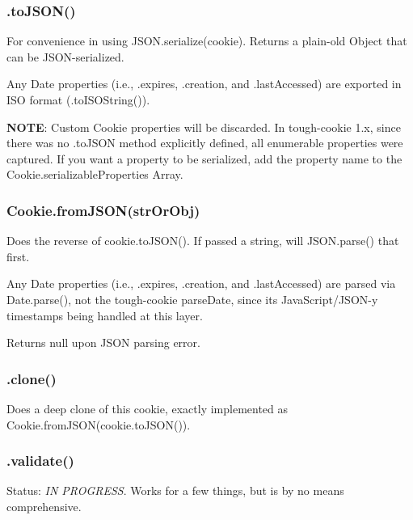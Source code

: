 \subsubsection*{{\ttfamily .to\+J\+S\+O\+N()}}

For convenience in using {\ttfamily J\+S\+O\+N.\+serialize(cookie)}. Returns a plain-\/old {\ttfamily Object} that can be J\+S\+O\+N-\/serialized.

Any {\ttfamily Date} properties (i.\+e., {\ttfamily .expires}, {\ttfamily .creation}, and {\ttfamily .last\+Accessed}) are exported in I\+SO format ({\ttfamily .to\+I\+S\+O\+String()}).

{\bfseries N\+O\+TE}\+: Custom {\ttfamily Cookie} properties will be discarded. In tough-\/cookie 1.\+x, since there was no {\ttfamily .to\+J\+S\+ON} method explicitly defined, all enumerable properties were captured. If you want a property to be serialized, add the property name to the {\ttfamily Cookie.\+serializable\+Properties} Array.

\subsubsection*{{\ttfamily Cookie.\+from\+J\+S\+O\+N(str\+Or\+Obj)}}

Does the reverse of {\ttfamily cookie.\+to\+J\+S\+O\+N()}. If passed a string, will {\ttfamily J\+S\+O\+N.\+parse()} that first.

Any {\ttfamily Date} properties (i.\+e., {\ttfamily .expires}, {\ttfamily .creation}, and {\ttfamily .last\+Accessed}) are parsed via {\ttfamily Date.\+parse()}, not the tough-\/cookie {\ttfamily parse\+Date}, since it\textquotesingle{}s Java\+Script/\+J\+S\+O\+N-\/y timestamps being handled at this layer.

Returns {\ttfamily null} upon J\+S\+ON parsing error.

\subsubsection*{{\ttfamily .clone()}}

Does a deep clone of this cookie, exactly implemented as {\ttfamily Cookie.\+from\+J\+S\+ON(cookie.\+to\+J\+S\+O\+N())}.

\subsubsection*{{\ttfamily .validate()}}

Status\+: {\itshape IN P\+R\+O\+G\+R\+E\+SS}. Works for a few things, but is by no means comprehensive.

